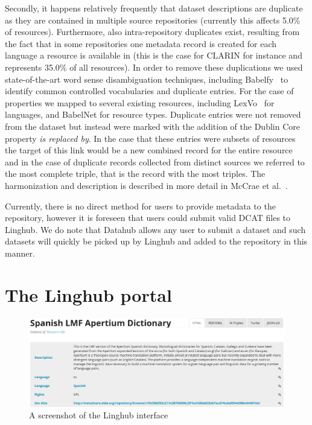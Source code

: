 \documentclass{acm_proc_article-sp}
\begin{document}
Secondly, it happens relatively frequently that dataset descriptions are
duplicate as they are contained in multiple source repositories (currently this
affects 5.0\% of resources).
Furthermore, also intra-repository duplicates exist, resulting from the fact
that in some repositories one metadata record is created for each language a
resource is available in (this is the case for CLARIN for instance and
represents 35.0\% of all resources). In order to remove
these duplications we used state-of-the-art word sense disambiguation techniques, 
including Babelfy~\cite{Moroetal:14tacl} to identify common controlled vocabularies and duplicate
entries. For the case of properties we mapped to several existing resources, 
including LexVo~\cite{de2013lexvo} for languages, and BabelNet for resource types. Duplicate 
entries were not removed from the dataset but instead were marked with the addition
of the Dublin Core property \emph{is replaced by}. In the case that these entries
were subsets of resources the target of this link would be a new combined record
for the entire resource and in the case of duplicate records collected from distinct
sources we referred to the most complete triple, that is the record with the most
triples. The harmonization and description is described in more detail in McCrae
et al.~\cite{mccrae2015reconciling}.

Currently, there is no direct method for users to provide metadata to the repository,
however it is foreseen that users could submit valid DCAT files to Linghub. We do
note that Datahub allows any user to submit a dataset and such datasets will quickly be 
picked up by Linghub and added to the repository in this manner.

\section{The Linghub portal}

\label{sec:portal}

\begin{figure}
\includegraphics[width=\textwidth]{linghub-screenshot.png}
\caption{A screenshot of the Linghub interface\label{fig:screenshot}}
\end{figure}
\end{document}
